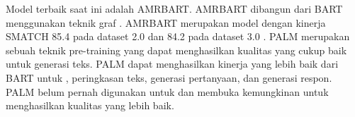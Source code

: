 Model \amrparsing{} terbaik saat ini adalah \gls{AMRBART}.
\gls{AMRBART} dibangun dari  \gls{BART} menggunakan teknik graf \pretraining{}.
\gls{AMRBART} merupakan model \sota{} dengan kinerja SMATCH 85.4 pada dataset \AMR{} 2.0 dan 84.2 pada dataset \AMR{} 3.0 .
\gls{PALM} merupakan sebuah teknik pre-training yang dapat menghasilkan kualitas  yang cukup baik untuk  generasi teks.
\gls{PALM} dapat menghasilkan kinerja yang lebih baik dari \gls{BART} untuk  , peringkasan teks, generasi pertanyaan, dan generasi respon.
\gls{PALM} belum pernah digunakan untuk  \amrparsing{} dan membuka kemungkinan untuk menghasilkan kualitas yang lebih baik.
